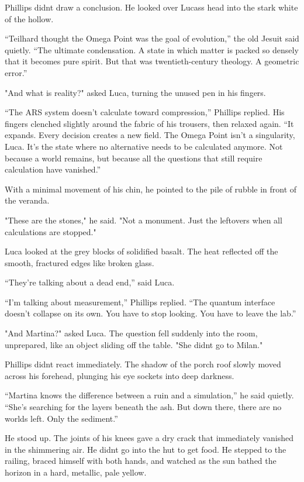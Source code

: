 \documentclass[
  ngerman,
]{article}
\begin{document}
Phillips didn\textquotesingle t draw a conclusion. He looked over
Lucas\textquotesingle s head into the stark white of the hollow.

``Teilhard thought the Omega Point was the goal of evolution,'' the old
Jesuit said quietly. ``The ultimate condensation. A state in which
matter is packed so densely that it becomes pure spirit. But that was
twentieth-century theology. A geometric error.''

"And what is reality?" asked Luca, turning the unused pen in his
fingers.

``The ARS system doesn't calculate toward compression,'' Phillips
replied. His fingers clenched slightly around the fabric of his
trousers, then relaxed again. ``It expands. Every decision creates a new
field. The Omega Point isn't a singularity, Luca. It's the state where
no alternative needs to be calculated anymore. Not because a world
remains, but because all the questions that still require calculation
have vanished.''

With a minimal movement of his chin, he pointed to the pile of rubble in
front of the veranda.

"These are the stones," he said. "Not a monument. Just the leftovers
when all calculations are stopped."

Luca looked at the grey blocks of solidified basalt. The heat reflected
off the smooth, fractured edges like broken glass.

``They're talking about a dead end,'' said Luca.

``I'm talking about measurement,'' Phillips replied. ``The quantum
interface doesn't collapse on its own. You have to stop looking. You
have to leave the lab.''

"And Martina?" asked Luca. The question fell suddenly into the room,
unprepared, like an object sliding off the table. "She
didn\textquotesingle t go to Milan."

Phillips didn\textquotesingle t react immediately. The shadow of the
porch roof slowly moved across his forehead, plunging his eye sockets
into deep darkness.

``Martina knows the difference between a ruin and a simulation,'' he
said quietly. ``She's searching for the layers beneath the ash. But down
there, there are no worlds left. Only the sediment.''

He stood up. The joints of his knees gave a dry crack that immediately
vanished in the shimmering air. He didn\textquotesingle t go into the
hut to get food. He stepped to the railing, braced himself with both
hands, and watched as the sun bathed the horizon in a hard, metallic,
pale yellow.
\end{document}
